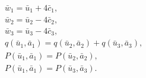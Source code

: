 \begin{equation}
\label{eq:sys3}
\begin{aligned}
&\bar w_1 = \bar u_1 + 4 \bar c_1, \\
&\bar w_2 = \bar u_2 - 4 \bar c_2, \\
&\bar w_3 = \bar u_3 - 4 \bar c_3, \\
&q(\bar u_1, \bar a_1) = q(\bar u_2, \bar a_2) + q(\bar u_3, \bar a_3), \\
&P(\bar u_1, \bar a_1) = P(\bar u_2, \bar a_2), \\
&P(\bar u_1, \bar a_1) = P(\bar u_3, \bar a_3).
\end{aligned}
\end{equation}
